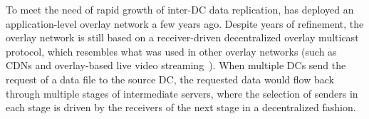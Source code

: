 To meet the need of rapid growth of inter-DC data replication,
\company has deployed an application-level
overlay network a few years ago.
Despite years of refinement, the overlay network
is still based on a receiver-driven decentralized
overlay multicast protocol, which
resembles what was used in other overlay networks
(such as CDNs and overlay-based live video
streaming~\cite{Andreev2013Designing,sripanidkulchai2004analysis,zhang2005coolstreaming}).
When multiple DCs send the request of a data file
to the source DC, the requested data would flow back
through multiple stages of
intermediate servers, where the selection of senders in each stage
is driven by the receivers of the next stage in a decentralized
fashion.




